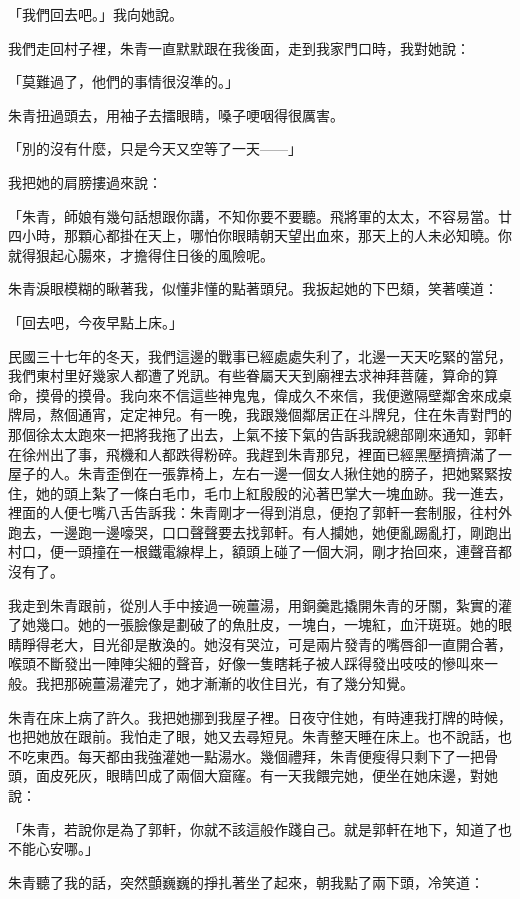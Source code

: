 \documentclass[b5paper,11pt,twoside,twocolumn]{ctexbook}
\begin{document}
「我們回去吧。」我向她說。

我們走回村子裡，朱青一直默默跟在我後面，走到我家門口時，我對她說：

「莫難過了，他們的事情很沒準的。」

朱青扭過頭去，用袖子去擂眼睛，嗓子哽咽得很厲害。

「別的沒有什麼，只是今天又空等了一天——」

我把她的肩膀摟過來說：

「朱青，師娘有幾句話想跟你講，不知你要不要聽。飛將軍的太太，不容易當。廿四小時，那顆心都掛在天上，哪怕你眼睛朝天望出血來，那天上的人未必知曉。你就得狠起心腸來，才擔得住日後的風險呢。

朱青淚眼模糊的瞅著我，似懂非懂的點著頭兒。我扳起她的下巴頦，笑著嘆道：

「回去吧，今夜早點上床。」

民國三十七年的冬天，我們這邊的戰事已經處處失利了，北邊一天天吃緊的當兒，我們東村里好幾家人都遭了兇訊。有些眷屬天天到廟裡去求神拜菩薩，算命的算命，摸骨的摸骨。我向來不信這些神鬼鬼，偉成久不來信，我便邀隔壁鄰舍來成桌牌局，熬個通宵，定定神兒。有一晚，我跟幾個鄰居正在斗牌兒，住在朱青對門的那個徐太太跑來一把將我拖了出去，上氣不接下氣的告訴我說總部剛來通知，郭軒在徐州出了事，飛機和人都跌得粉碎。我趕到朱青那兒，裡面已經黑壓擠擠滿了一屋子的人。朱青歪倒在一張靠椅上，左右一邊一個女人揪住她的膀子，把她緊緊按住，她的頭上紮了一條白毛巾，毛巾上紅殷殷的沁著巴掌大一塊血跡。我一進去，裡面的人便七嘴八舌告訴我：朱青剛才一得到消息，便抱了郭軒一套制服，往村外跑去，一邊跑一邊嚎哭，口口聲聲要去找郭軒。有人攔她，她便亂踢亂打，剛跑出村口，便一頭撞在一根鐵電線桿上，額頭上碰了一個大洞，剛才抬回來，連聲音都沒有了。

我走到朱青跟前，從別人手中接過一碗薑湯，用銅羹匙撬開朱青的牙關，紮實的灌了她幾口。她的一張臉像是劃破了的魚肚皮，一塊白，一塊紅，血汗斑斑。她的眼睛睜得老大，目光卻是散渙的。她沒有哭泣，可是兩片發青的嘴唇卻一直開合著，喉頭不斷發出一陣陣尖細的聲音，好像一隻瞎耗子被人踩得發出吱吱的慘叫來一般。我把那碗薑湯灌完了，她才漸漸的收住目光，有了幾分知覺。


朱青在床上病了許久。我把她挪到我屋子裡。日夜守住她，有時連我打牌的時候，也把她放在跟前。我怕走了眼，她又去尋短見。朱青整天睡在床上。也不說話，也不吃東西。每天都由我強灌她一點湯水。幾個禮拜，朱青便瘦得只剩下了一把骨頭，面皮死灰，眼睛凹成了兩個大窟窿。有一天我餵完她，便坐在她床邊，對她說：

「朱青，若說你是為了郭軒，你就不該這般作踐自己。就是郭軒在地下，知道了也不能心安哪。」

朱青聽了我的話，突然顫巍巍的掙扎著坐了起來，朝我點了兩下頭，冷笑道：
\end{document}
